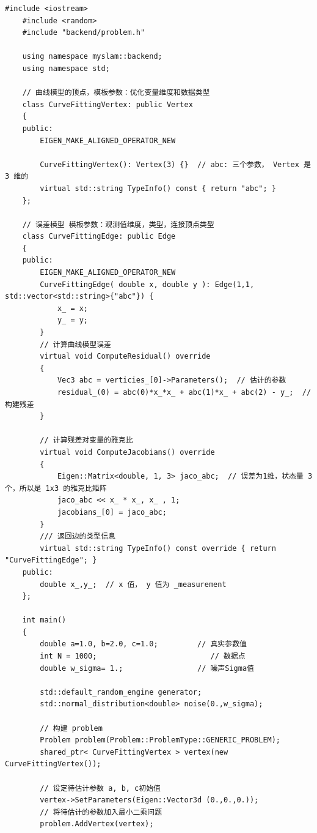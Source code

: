 \documentclass[oneside]{article}
\begin{document}
\begin{lstlisting}[caption={}]
    #include <iostream>
    #include <random>
    #include "backend/problem.h"
    
    using namespace myslam::backend;
    using namespace std;
    
    // 曲线模型的顶点，模板参数：优化变量维度和数据类型
    class CurveFittingVertex: public Vertex
    {
    public:
        EIGEN_MAKE_ALIGNED_OPERATOR_NEW
    
        CurveFittingVertex(): Vertex(3) {}  // abc: 三个参数， Vertex 是 3 维的
        virtual std::string TypeInfo() const { return "abc"; }
    };
    
    // 误差模型 模板参数：观测值维度，类型，连接顶点类型
    class CurveFittingEdge: public Edge
    {
    public:
        EIGEN_MAKE_ALIGNED_OPERATOR_NEW
        CurveFittingEdge( double x, double y ): Edge(1,1, std::vector<std::string>{"abc"}) {
            x_ = x;
            y_ = y;
        }
        // 计算曲线模型误差
        virtual void ComputeResidual() override
        {
            Vec3 abc = verticies_[0]->Parameters();  // 估计的参数
            residual_(0) = abc(0)*x_*x_ + abc(1)*x_ + abc(2) - y_;  // 构建残差
        }
    
        // 计算残差对变量的雅克比
        virtual void ComputeJacobians() override
        {
            Eigen::Matrix<double, 1, 3> jaco_abc;  // 误差为1维，状态量 3 个，所以是 1x3 的雅克比矩阵
            jaco_abc << x_ * x_, x_ , 1;
            jacobians_[0] = jaco_abc;
        }
        /// 返回边的类型信息
        virtual std::string TypeInfo() const override { return "CurveFittingEdge"; }
    public:
        double x_,y_;  // x 值， y 值为 _measurement
    };
    
    int main()
    {
        double a=1.0, b=2.0, c=1.0;         // 真实参数值
        int N = 1000;                          // 数据点
        double w_sigma= 1.;                 // 噪声Sigma值
    
        std::default_random_engine generator;
        std::normal_distribution<double> noise(0.,w_sigma);
    
        // 构建 problem
        Problem problem(Problem::ProblemType::GENERIC_PROBLEM);
        shared_ptr< CurveFittingVertex > vertex(new CurveFittingVertex());
    
        // 设定待估计参数 a, b, c初始值
        vertex->SetParameters(Eigen::Vector3d (0.,0.,0.));
        // 将待估计的参数加入最小二乘问题
        problem.AddVertex(vertex);
    

\end{lstlisting}
\end{document}
